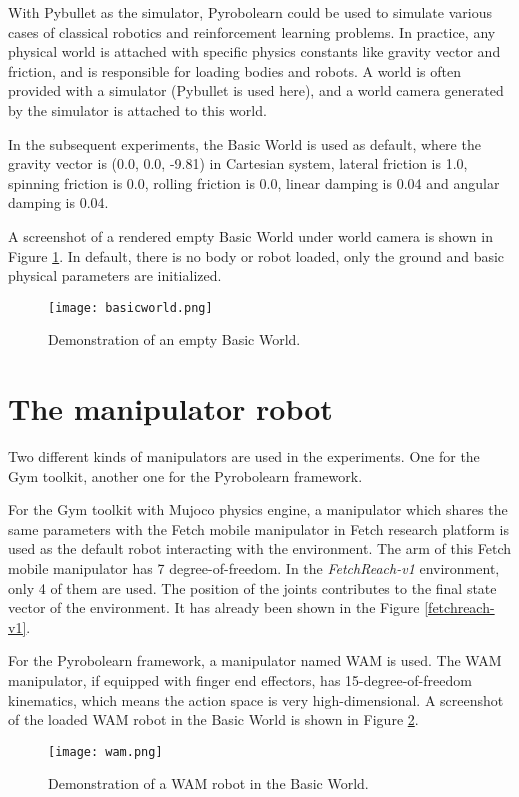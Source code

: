 \documentclass[a4paper, 12pt]{report}
\begin{document}
    With Pybullet as the simulator, Pyrobolearn could be used to simulate various cases of classical robotics and reinforcement learning problems. In practice, any physical world is attached with specific physics constants like gravity vector and friction, and is responsible for loading bodies and robots. A world is often provided with a simulator (Pybullet is used here), and a world camera generated by the simulator is attached to this world.

    In the subsequent experiments, the Basic World is used as default, where the gravity vector is (0.0, 0.0, -9.81) in Cartesian system, lateral friction is 1.0, spinning friction is 0.0, rolling friction is 0.0, linear damping is 0.04 and angular damping is 0.04.

    A screenshot of a rendered empty Basic World under world camera is shown in Figure \ref{basicworld}. In default, there is no body or robot loaded, only the ground and basic physical parameters are initialized.

    \begin{figure}
        \centering
        \texttt{[image: basicworld.png]}
        \caption{Demonstration of an empty Basic World. }
        \label{basicworld}
    \end{figure}

    \section {The manipulator robot}

    Two different kinds of manipulators are used in the experiments. One for the Gym toolkit, another one for the Pyrobolearn framework.

    For the Gym toolkit with Mujoco physics engine, a manipulator which shares the same parameters with the Fetch mobile manipulator in Fetch research platform is used as the default robot interacting with the environment\cite{Wise2016FetchF}. The arm of this Fetch mobile manipulator has 7 degree-of-freedom. In the \emph{FetchReach-v1} environment, only 4 of them are used. The position of the joints contributes to the final state vector of the environment. It has already been shown in the Figure \ref{fetchreach-v1}.

    For the Pyrobolearn framework, a manipulator named WAM is used. The WAM manipulator, if equipped with finger end effectors, has 15-degree-of-freedom kinematics, which means the action space is very high-dimensional. A screenshot of the loaded WAM robot in the Basic World is shown in Figure \ref{wam}.
    \begin{figure}
        \centering
        \texttt{[image: wam.png]}
        \caption{Demonstration of a WAM robot in the Basic World. }
        \label{wam}
    \end{figure}
    
\end{document}
